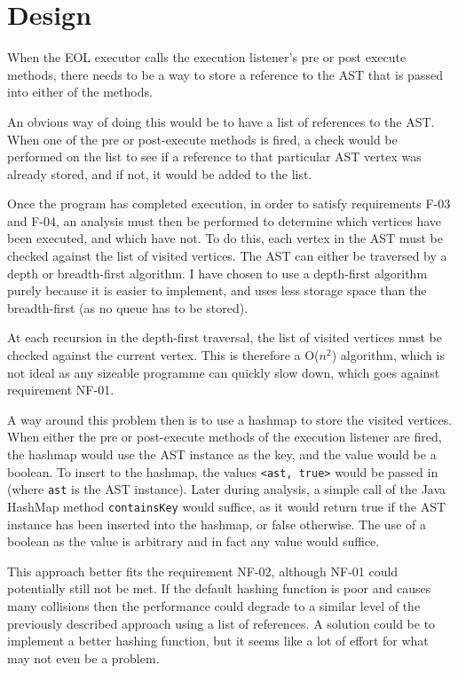 \section{Design}

When the EOL executor calls the execution listener's pre or post execute methods, there needs to be a way to store a reference to the AST that is passed into either of the methods.

An obvious way of doing this would be to have a list of references to the AST. When one of the pre or post-execute methods is fired, a check would be performed on the list to see if a reference to that particular AST vertex was already stored, and if not, it would be added to the list.

Once the program has completed execution, in order to satisfy requirements F-03 and F-04, an analysis must then be performed to determine which vertices have been executed, and which have not. To do this, each vertex in the AST must be checked against the list of visited vertices. The AST can either be traversed by a depth or breadth-first algorithm. I have chosen to use a depth-first algorithm purely because it is easier to implement, and uses less storage space than the breadth-first (as no queue has to be stored).

At each recursion in the depth-first traversal, the list of visited vertices must be checked against the current vertex. This is therefore a O($n^2$) algorithm, which is not ideal as any sizeable programme can quickly slow down, which goes against requirement NF-01. 

A way around this problem then is to use a hashmap to store the visited vertices. When either the pre or post-execute methods of the execution listener are fired, the hashmap would use the AST instance as the key, and the value would be a boolean. To insert to the hashmap, the values \verb|<ast, true>| would be passed in (where \verb|ast| is the AST instance). Later during analysis, a simple call of the Java HashMap method \verb|containsKey| would suffice, as it would return true if the AST instance has been inserted into the hashmap, or false otherwise. The use of a boolean as the value is arbitrary and in fact any value would suffice. 

This approach better fits the requirement NF-02, although NF-01 could potentially still not be met. If the default hashing function is poor and causes many collisions then the performance could degrade to a similar level of the previously described approach using a list of references. A solution could be to implement a better hashing function, but it seems like a lot of effort for what may not even be a problem.

